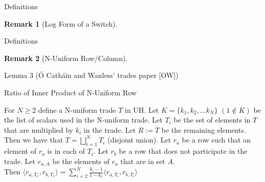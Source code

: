 \documentclass{beamer}
\newtheorem{remark}{Remark}
\begin{document}
\begin{frame}{Definitions}
    \begin{definition}[Trade]
        
    \end{definition}
    \pause
    \begin{definition}[Switch]
        
    \end{definition}
    \pause
    \begin{remark}[Log Form of a Switch]
        
    \end{remark}
\end{frame}
\begin{frame}{Definitions}
    \begin{definition}
        
    \end{definition}
    \pause
    \begin{remark}[N-Uniform Row/Column]
        
    \end{remark}
\end{frame}
\begin{frame}{Lemma 3 (\'{O} Cath\'{a}in and Wanless' trades paper [OW])}%
    \begin{lemma}[Lemma 3]
        
    \end{lemma}
\end{frame}

\begin{frame}{Ratio of Inner Product of N-Uniform Row}
    \begin{lemma}%
        For $N\geq2$ define a N-uniform trade $T$ in UH. Let $K=\{k_1,k_2,\dots k_N\}$ $(1\notin K)$ be the list of scalars used in the N-uniform trade. Let $T_i$ be the set of elements in $T$ that are multiplied by $k_i$ in the trade. Let $R:=\overline{T}$ be the remaining elements. Then we have that $T=\bigsqcup_{i=1}^NT_i$ (disjoint union). Let $r_a$ be a row such that an element of $r_a$ is in each of $T_i$. Let $r_b$ be a row that does not participate in the trade. Let $r_{a,A}$ be the elements of $r_a$ that are in set $A$.\\
    Then $\langle r_{a,T_1},r_{b,T_1}\rangle=\sum_{i=2}^N\frac{k_i-1}{1-k_1}\langle r_{a,T_i},r_{b,T_i}\rangle$
    \end{lemma}
\end{frame}
\end{document}
